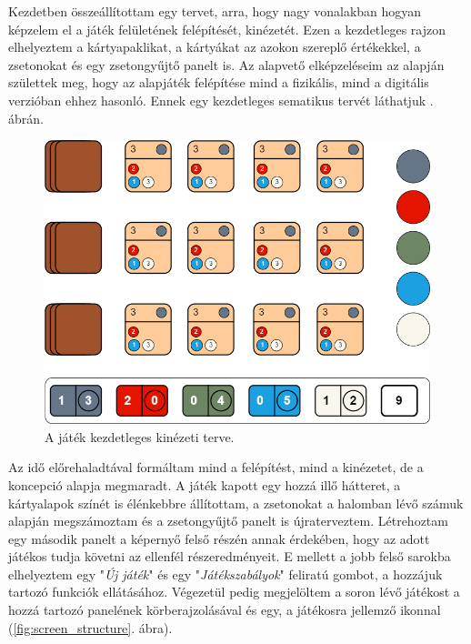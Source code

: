 


Kezdetben összeállítottam egy tervet, arra, hogy nagy vonalakban hogyan képzelem el a játék felületének felépítését, kinézetét. Ezen a kezdetleges rajzon elhelyeztem a kártyapaklikat, a kártyákat az azokon szereplő értékekkel, a zsetonokat és egy zsetongyűjtő panelt is. Az alapvető elképzeléseim az alapján születtek meg, hogy az alapjáték felépítése mind a fizikális, mind a digitális verzióban ehhez hasonló. Ennek egy kezdetleges sematikus tervét láthatjuk . ábrán.

\begin{figure}[h]
\centering
\includegraphics[scale=0.37]{images/screen_structure_plan.png}
\caption{A játék kezdetleges kinézeti terve.}
\label{fig:screen_structure_plan}
\end{figure}


Az idő előrehaladtával formáltam mind a felépítést, mind a kinézetet, de a koncepció alapja megmaradt. A játék kapott egy hozzá illő hátteret, a kártyalapok színét is élénkebbre állítottam, a zsetonokat a halomban lévő számuk alapján megszámoztam és a zsetongyűjtő panelt is újraterveztem. Létrehoztam egy második panelt a képernyő felső részén annak érdekében, hogy az adott játékos tudja követni az ellenfél részeredményeit.
E mellett a jobb felső sarokba elhelyeztem egy "\textit{Új játék}" és egy "\textit{Játékszabályok}" feliratú gombot, a hozzájuk tartozó funkciók ellátásához. Végezetül pedig megjelöltem a soron lévő játékost a hozzá tartozó panelének körberajzolásával és egy, a játékosra jellemző ikonnal (\ref{fig:screen_structure}. ábra).

